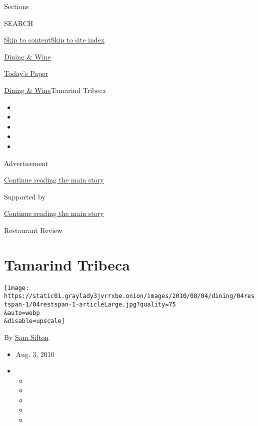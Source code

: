 Sections

SEARCH

\protect\hyperlink{site-content}{Skip to
content}\protect\hyperlink{site-index}{Skip to site index}

\href{https://www.nytimes3xbfgragh.onion/pages/dining/index.html}{Dining
\& Wine}

\href{https://myaccount.nytimes3xbfgragh.onion/auth/login?response_type=cookie\&client_id=vi}{}

\href{https://www.nytimes3xbfgragh.onion/section/todayspaper}{Today's
Paper}

\href{/pages/dining/index.html}{Dining \& Wine}\textbar{}Tamarind
Tribeca

\begin{itemize}
\item
\item
\item
\item
\item
\end{itemize}

Advertisement

\protect\hyperlink{after-top}{Continue reading the main story}

Supported by

\protect\hyperlink{after-sponsor}{Continue reading the main story}

Restaurant Review

\hypertarget{tamarind-tribeca}{%
\section{Tamarind Tribeca}\label{tamarind-tribeca}}

\texttt{[image: https://static01.graylady3jvrrxbe.onion/images/2010/08/04/dining/04restspan-1/04restspan-1-articleLarge.jpg?quality=75\\\&auto=webp\\\&disable=upscale]}

By \href{https://www.nytimes3xbfgragh.onion/by/sam-sifton}{Sam Sifton}

\begin{itemize}
\item
  Aug. 3, 2010
\item
  \begin{itemize}
  \item
  \item
  \item
  \item
  \item
  \end{itemize}
\end{itemize}


